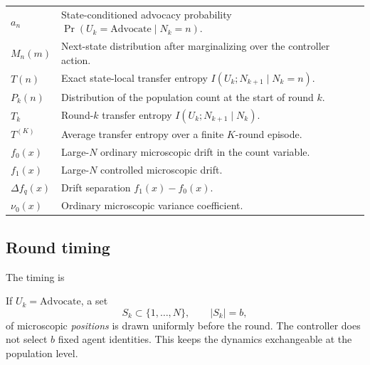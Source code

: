\documentclass[11pt,a4paper]{article}
\newcommand{\Adv}{\ensuremath{\mathrm{Advocate}}}
\newcommand{\Prb}{\operatorname{Pr}}
\newcommand{\1}{\mathbbm{1}}
\begin{document}
\begin{longtable}{>{\raggedright\arraybackslash}p{2.0cm}>{\raggedright\arraybackslash}p{11.8cm}}
$a_n$ & State-conditioned advocacy probability $\Prb(U_k=\Adv\mid N_k=n)$. \\
$M_n(m)$ & Next-state distribution after marginalizing over the controller action. \\
$T(n)$ & Exact state-local transfer entropy $I(U_k;N_{k+1}\mid N_k=n)$. \\
$P_k(n)$ & Distribution of the population count at the start of round $k$. \\
$T_k$ & Round-$k$ transfer entropy $I(U_k;N_{k+1}\mid N_k)$. \\
$T^{(K)}$ & Average transfer entropy over a finite $K$-round episode. \\
$f_0(x)$ & Large-$N$ ordinary microscopic drift in the count variable. \\
$f_1(x)$ & Large-$N$ controlled microscopic drift. \\
$\Delta f_q(x)$ & Drift separation $f_1(x)-f_0(x)$. \\
$\nu_0(x)$ & Ordinary microscopic variance coefficient. \\
\bottomrule
\end{longtable}

\subsection{Round timing}

The timing is
\begin{center}
\end{center}

If $U_k=\Adv$, a set
\[
S_k\subset\{1,\ldots,N\},\qquad |S_k|=b,
\]
of microscopic \emph{positions} is drawn uniformly before the round. The controller does not select $b$ fixed agent identities. This keeps the dynamics exchangeable at the population level.
\end{document}
